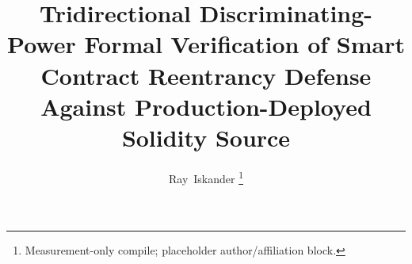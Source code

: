 \documentclass[10pt,journal,compsoc]{IEEEtran}
\title{Tridirectional Discriminating-Power Formal Verification of Smart
Contract Reentrancy Defense Against Production-Deployed Solidity Source}
\author{Ray~Iskander%
\thanks{Measurement-only compile; placeholder author/affiliation block.}}
\begin{document}
\maketitle
\begin{abstract}

\end{abstract}
\IEEEpeerreviewmaketitle

\end{document}
